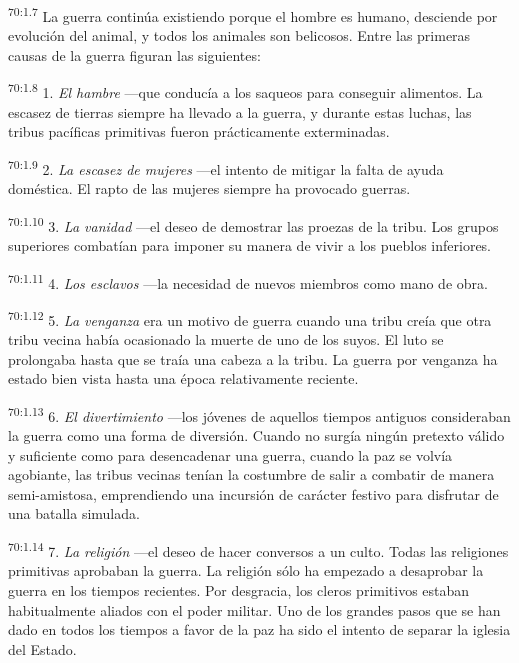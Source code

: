\documentclass[twoside, 11pt]{book}
\begin{document}
\par
\textsuperscript{70:1.7} La guerra continúa existiendo porque el hombre es humano, desciende por evolución del animal, y todos los animales son belicosos. Entre las primeras causas de la guerra figuran las siguientes:

\par
\textsuperscript{70:1.8} 1. \textit{El hambre} ---que conducía a los saqueos para conseguir alimentos. La escasez de tierras siempre ha llevado a la guerra, y durante estas luchas, las tribus pacíficas primitivas fueron prácticamente exterminadas.

\par
\textsuperscript{70:1.9} 2. \textit{La escasez de mujeres} ---el intento de mitigar la falta de ayuda doméstica. El rapto de las mujeres siempre ha provocado guerras.

\par
\textsuperscript{70:1.10} 3. \textit{La vanidad} ---el deseo de demostrar las proezas de la tribu. Los grupos superiores combatían para imponer su manera de vivir a los pueblos inferiores.

\par
\textsuperscript{70:1.11} 4. \textit{Los esclavos} ---la necesidad de nuevos miembros como mano de obra.

\par
\textsuperscript{70:1.12} 5. \textit{La venganza} era un motivo de guerra cuando una tribu creía que otra tribu vecina había ocasionado la muerte de uno de los suyos. El luto se prolongaba hasta que se traía una cabeza a la tribu. La guerra por venganza ha estado bien vista hasta una época relativamente reciente.

\par
\textsuperscript{70:1.13} 6. \textit{El divertimiento} ---los jóvenes de aquellos tiempos antiguos consideraban la guerra como una forma de diversión. Cuando no surgía ningún pretexto válido y suficiente como para desencadenar una guerra, cuando la paz se volvía agobiante, las tribus vecinas tenían la costumbre de salir a combatir de manera semi-amistosa, emprendiendo una incursión de carácter festivo para disfrutar de una batalla simulada.

\par
\textsuperscript{70:1.14} 7. \textit{La religión} ---el deseo de hacer conversos a un culto. Todas las religiones primitivas aprobaban la guerra. La religión sólo ha empezado a desaprobar la guerra en los tiempos recientes. Por desgracia, los cleros primitivos estaban habitualmente aliados con el poder militar. Uno de los grandes pasos que se han dado en todos los tiempos a favor de la paz ha sido el intento de separar la iglesia del Estado.
\end{document}
